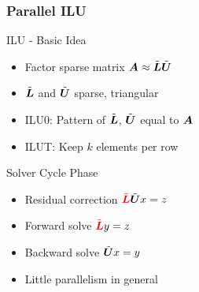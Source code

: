 







\begin{frame}[fragile]
\frametitle{Parallel ILU}

  \begin{minipage}{0.5\textwidth}
    \begin{block}{ILU - Basic Idea}
      \begin{itemize}
        \item Factor sparse matrix $\boldsymbol{A} \approx \tilde{\boldsymbol{L}} \tilde{\boldsymbol{U}}$
        \item $\tilde{\boldsymbol{L}}$ and $\tilde{\boldsymbol{U}}$ sparse, triangular
        \item ILU0: Pattern of $\tilde{\boldsymbol{L}}$, $\tilde{\boldsymbol{U}}$ equal to $\boldsymbol{A}$
        \item ILUT: Keep $k$ elements per row
      \end{itemize}
    \end{block}
  \end{minipage}
%
  \begin{minipage}{0.45\textwidth}
    \begin{block}{Solver Cycle Phase}
      \vspace*{-0.1cm}
      \begin{itemize}
        \item Residual correction ${\color{red}\tilde{\matrix L}} \tilde{\matrix U} x = z$
        \item Forward solve ${\color{red}\tilde{\matrix L}} y = z$
        \item Backward solve $\tilde{\boldsymbol{U}} x = y$
        \item Little parallelism in general
      \end{itemize}
    \end{block}
  \end{minipage}



\end{frame}
